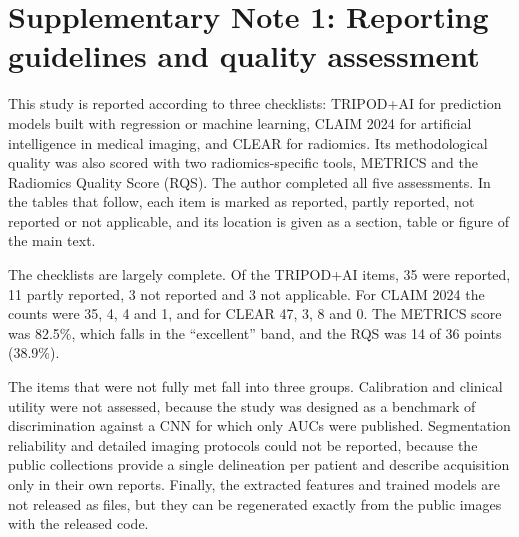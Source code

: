 \section*{Supplementary Note 1: Reporting guidelines and quality assessment}
This study is reported according to three checklists: TRIPOD+AI for prediction models built with regression or machine learning, CLAIM 2024 for artificial intelligence in medical imaging, and CLEAR for radiomics. Its methodological quality was also scored with two radiomics-specific tools, METRICS and the Radiomics Quality Score (RQS). The author completed all five assessments. In the tables that follow, each item is marked as reported, partly reported, not reported or not applicable, and its location is given as a section, table or figure of the main text.

The checklists are largely complete. Of the TRIPOD+AI items, 35 were reported, 11 partly reported, 3 not reported and 3 not applicable. For CLAIM 2024 the counts were 35, 4, 4 and 1, and for CLEAR 47, 3, 8 and 0. The METRICS score was 82.5\%, which falls in the ``excellent'' band, and the RQS was 14 of 36 points (38.9\%).

The items that were not fully met fall into three groups. Calibration and clinical utility were not assessed, because the study was designed as a benchmark of discrimination against a CNN for which only AUCs were published. Segmentation reliability and detailed imaging protocols could not be reported, because the public collections provide a single delineation per patient and describe acquisition only in their own reports. Finally, the extracted features and trained models are not released as files, but they can be regenerated exactly from the public images with the released code.


